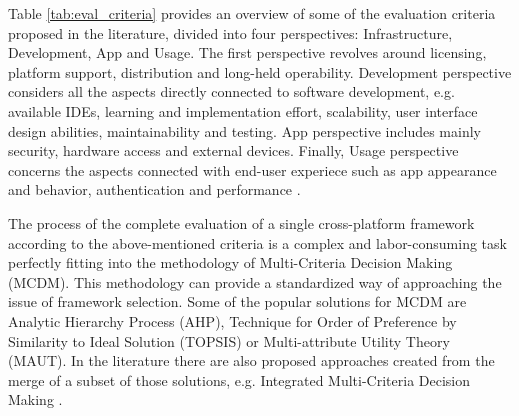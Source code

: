 Table \ref{tab:eval_criteria} provides an overview of some of the evaluation criteria proposed in the literature, divided into four perspectives: Infrastructure, Development, App and Usage. The first perspective revolves around licensing, platform support, distribution and long-held operability. Development perspective considers all the aspects directly connected to software development, e.g. available IDEs, learning and implementation effort, scalability, user interface design abilities, maintainability and testing. App perspective includes mainly security, hardware access and external devices. Finally, Usage perspective concerns the aspects connected with end-user experiece such as app appearance and behavior, authentication and performance \cite{eval_rn_flutter,rieger_eval_cp}.

The process of the complete evaluation of a single cross-platform framework according to the above-mentioned criteria is a complex and labor-consuming task perfectly fitting into the methodology of Multi-Criteria Decision Making (MCDM). This methodology can provide a standardized way of approaching the issue of framework selection. Some of the popular solutions for MCDM are Analytic Hierarchy Process (AHP), Technique for Order of Preference by Similarity to Ideal Solution (TOPSIS) or Multi-attribute Utility Theory (MAUT). In the literature there are also proposed approaches created from the merge of a subset of those solutions, e.g. Integrated Multi-Criteria Decision Making \cite{lachgar_mcdm_cp}.
